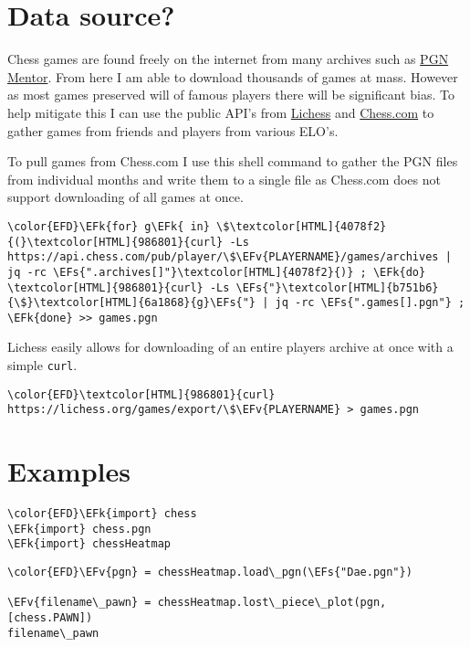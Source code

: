 \documentclass[11pt]{article}
\newcommand{\EFk}[1]{\textcolor{EFk}{#1}} %
\newcommand{\EFs}[1]{\textcolor{EFs}{#1}} %
\newcommand{\EFv}[1]{\textcolor{EFv}{#1}} %
\begin{document}
\section{Data source?}
\label{sec:org04ae696}
Chess games are found freely on the internet from many archives such as \href{https://www.pgnmentor.com/files.html}{PGN
Mentor}. From here I am able to download thousands of games at mass. However as
most games preserved will of famous players there will be significant bias. To
help mitigate this I can use the public API's from \href{https://lichess.org/}{Lichess} and \href{https://www.chess.com/}{Chess.com} to
gather games from friends and players from various ELO's.

To pull games from Chess.com I use this shell command to gather the PGN files
from individual months and write them to a single file as Chess.com does not
support downloading of all games at once.
\begin{Code}
\begin{Verbatim}[]
\color{EFD}\EFk{for} g\EFk{ in} \$\textcolor[HTML]{4078f2}{(}\textcolor[HTML]{986801}{curl} -Ls https://api.chess.com/pub/player/\$\EFv{PLAYERNAME}/games/archives | jq -rc \EFs{".archives[]"}\textcolor[HTML]{4078f2}{)} ; \EFk{do} \textcolor[HTML]{986801}{curl} -Ls \EFs{"}\textcolor[HTML]{b751b6}{\$}\textcolor[HTML]{6a1868}{g}\EFs{"} | jq -rc \EFs{".games[].pgn"} ; \EFk{done} >> games.pgn
\end{Verbatim}
\end{Code}

Lichess easily allows for downloading of an entire players archive at once with
a simple \texttt{curl}.
\begin{Code}
\begin{Verbatim}[]
\color{EFD}\textcolor[HTML]{986801}{curl} https://lichess.org/games/export/\$\EFv{PLAYERNAME} > games.pgn
\end{Verbatim}
\end{Code}

\section{Examples}
\label{sec:org7aaad79}
\begin{Code}
\begin{Verbatim}[]
\color{EFD}\EFk{import} chess
\EFk{import} chess.pgn
\EFk{import} chessHeatmap
\end{Verbatim}
\end{Code}

\begin{Code}
\begin{Verbatim}[]
\color{EFD}\EFv{pgn} = chessHeatmap.load\_pgn(\EFs{"Dae.pgn"})

\EFv{filename\_pawn} = chessHeatmap.lost\_piece\_plot(pgn, [chess.PAWN])
filename\_pawn
\end{Verbatim}
\end{Code}
\end{document}
